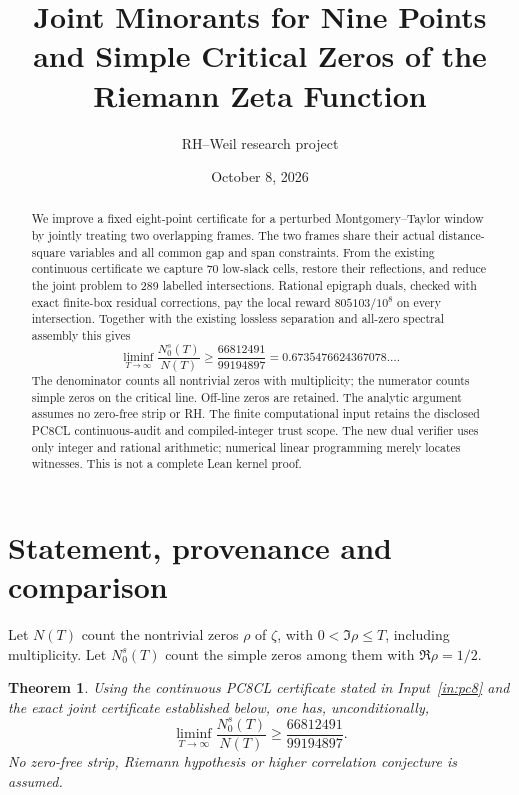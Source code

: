 \documentclass[11pt,a4paper]{article}
\title{Joint Minorants for Nine Points\\
and Simple Critical Zeros of the Riemann Zeta Function}
\author{RH--Weil research project}
\date{October 8, 2026}
\newtheorem{theorem}{Theorem}[section]
\theoremstyle{remark}
\begin{document}
\maketitle
\begin{abstract}
We improve a fixed eight-point certificate for a perturbed
Montgomery--Taylor window by jointly treating two overlapping frames.
The two frames share their actual distance-square variables and all
common gap and span constraints. From the existing continuous certificate
we capture 70 low-slack cells, restore their reflections, and reduce the
joint problem to 289 labelled intersections. Rational epigraph duals,
checked with exact finite-box residual corrections, pay the local reward
$805103/10^8$ on every intersection. Together with the existing
lossless separation and all-zero spectral assembly this gives
\[
 \liminf_{T\to\infty}\frac{N_0^s(T)}{N(T)}
 \ge\frac{66812491}{99194897}=0.6735476624367078\ldots.
\]
The denominator counts all nontrivial zeros with multiplicity; the
numerator counts simple zeros on the critical line. Off-line zeros are
retained. The analytic argument assumes no zero-free strip or RH.
The finite computational input retains the disclosed PC8CL
continuous-audit and compiled-integer trust scope. The new dual verifier
uses only integer and rational arithmetic; numerical linear programming
merely locates witnesses. This is not a complete Lean kernel proof.
\end{abstract}

\section{Statement, provenance and comparison}

Let $N(T)$ count the nontrivial zeros $\rho$ of $\zeta$, with
$0<\Im\rho\le T$, including multiplicity. Let $N_0^s(T)$ count the
simple zeros among them with $\Re\rho=1/2$.

\begin{theorem}\label{thm:main}
Using the continuous PC8CL certificate stated in
Input~\ref{in:pc8} and the exact joint certificate established below,
one has, unconditionally,
\begin{equation}\label{eq:main}
 \liminf_{T\to\infty}\frac{N_0^s(T)}{N(T)}
 \ge \frac{66812491}{99194897}.
\end{equation}
No zero-free strip, Riemann hypothesis or higher correlation
conjecture is assumed.
\end{theorem}
\end{document}
